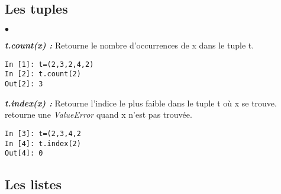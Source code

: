 \documentclass[10pt,dvipsnames,  dvips]{article}
\begin{document}

\subsection{Les tuples}

\begin{list}{$\bullet$}{}
\item \textit{\textbf{t.count(x) :}} Retourne le nombre d'occurrences de x dans le tuple t.
\begin{lstlisting}
In [1]: t=(2,3,2,4,2)
In [2]: t.count(2)
Out[2]: 3
\end{lstlisting}
\item \textit{\textbf{t.index(x) :}}  Retourne l'indice le plus faible dans le tuple t où x se trouve. retourne une \textit{ValueError} quand x n'est pas trouvée.
\begin{lstlisting}
In [3]: t=(2,3,4,2
In [4]: t.index(2)
Out[4]: 0
\end{lstlisting}
\end{list}

\subsection{Les listes}
\end{document}
